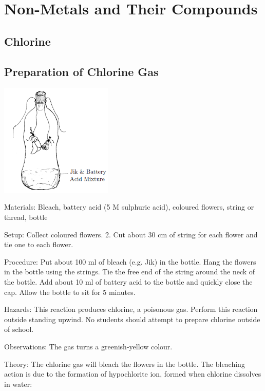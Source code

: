 \section{Non-Metals and Their Compounds}

\begin{multicols}{2}


\section*{Chlorine}


\subsection{Preparation of Chlorine Gas}

\begin{center}
\includegraphics[width=0.4\textwidth]{./img/chlorine.png}
\end{center}

\begin{description*}
\item[Materials:]{Bleach, battery acid (5 M sulphuric acid), coloured 
flowers, string or thread,
bottle}
\item[Setup:]{Collect coloured 
flowers.
2. Cut about 30 cm of string for each 
flower and tie one to each flower.}
\item[Procedure:]{Put about 100 ml of bleach (e.g. Jik) in the bottle. Hang the 
flowers in the bottle using the strings. Tie the free end of
the string around the neck of the bottle. Add about 10 ml of battery acid to the bottle and quickly close the cap. Allow the bottle to sit for 5 minutes.}
\item[Hazards:]{This reaction produces chlorine, a poisonous gas. Perform this reaction
outside standing upwind. No students should attempt to
prepare chlorine outside of school.}
\item[Observations:]{The gas turns a greenish-yellow colour.}
\item[Theory:]{The chlorine gas will bleach the 
flowers in the
bottle. The bleaching action is due to the formation of hypochlorite ion,
formed when chlorine dissolves in water: \\

}
\end{description*}
\end{multicols}
